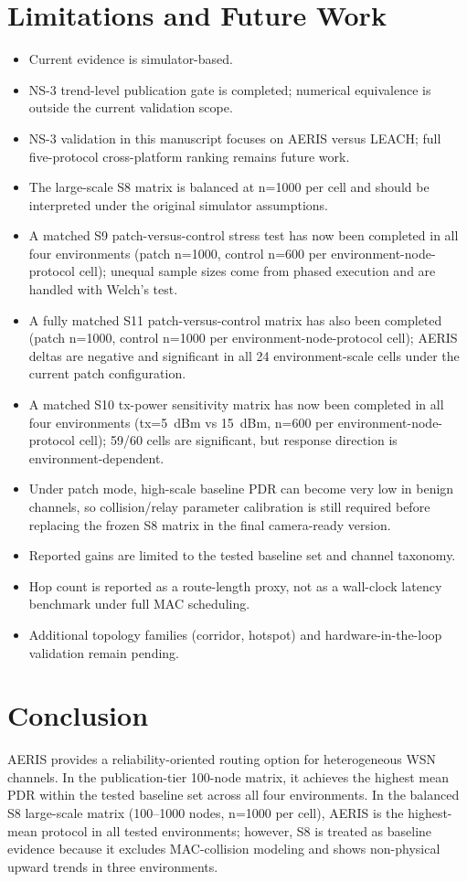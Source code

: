\documentclass[sensors,article,submit,moreauthors,pdftex]{Definitions/mdpi}
\begin{document}
\section{Limitations and Future Work}
\begin{itemize}
\item Current evidence is simulator-based.
\item NS-3 trend-level publication gate is completed; numerical equivalence is outside the current validation scope.
\item NS-3 validation in this manuscript focuses on AERIS versus LEACH; full five-protocol cross-platform ranking remains future work.
\item The large-scale S8 matrix is balanced at n=1000 per cell and should be interpreted under the original simulator assumptions.
\item A matched S9 patch-versus-control stress test has now been completed in all four environments (patch n=1000, control n=600 per environment-node-protocol cell); unequal sample sizes come from phased execution and are handled with Welch's test.
\item A fully matched S11 patch-versus-control matrix has also been completed (patch n=1000, control n=1000 per environment-node-protocol cell); AERIS deltas are negative and significant in all 24 environment-scale cells under the current patch configuration.
\item A matched S10 tx-power sensitivity matrix has now been completed in all four environments (tx=\SI{5}{dBm} vs \SI{15}{dBm}, n=600 per environment-node-protocol cell); 59/60 cells are significant, but response direction is environment-dependent.
\item Under patch mode, high-scale baseline PDR can become very low in benign channels, so collision/relay parameter calibration is still required before replacing the frozen S8 matrix in the final camera-ready version.
\item Reported gains are limited to the tested baseline set and channel taxonomy.
\item Hop count is reported as a route-length proxy, not as a wall-clock latency benchmark under full MAC scheduling.
\item Additional topology families (corridor, hotspot) and hardware-in-the-loop validation remain pending.
\end{itemize}

\section{Conclusion}
AERIS provides a reliability-oriented routing option for heterogeneous WSN channels. In the publication-tier 100-node matrix, it achieves the highest mean PDR within the tested baseline set across all four environments. In the balanced S8 large-scale matrix (100--1000 nodes, n=1000 per cell), AERIS is the highest-mean protocol in all tested environments; however, S8 is treated as baseline evidence because it excludes MAC-collision modeling and shows non-physical upward trends in three environments.
\end{document}
